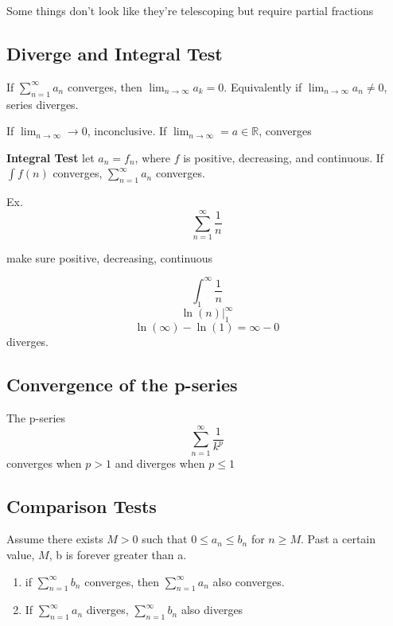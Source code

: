 Some things don't look like they're telescoping but require partial fractions

\subsection{Diverge and Integral Test}
If $\sum_{n=1}^{\infty}a_{n}$ converges, then $ \lim_{n\to\infty} a_{k}=0$. Equivalently if $ \lim_{n\to\infty} a_{n}\neq 0 $, series diverges.

If $\lim_{n\to\infty}\to0$, inconclusive. If $ \lim_{n\to\infty}=a\in\mathbb{R}$, converges



\hfill


\textbf{Integral Test} let $a_{n}=f_{n}$, where $f$ is positive, decreasing, and continuous. If $\int f(n)$ converges, $\sum_{n=1}^{\infty}a_{n}$ converges.

Ex.
\begin{equation}
	\label{}
\sum_{n=1}^{\infty}\frac{1}{n}
\end{equation}

make sure positive, decreasing, continuous 

\begin{equation}
	\label{}
	\int_{1}^{\infty} \frac{1}{n}
\end{equation}
\begin{equation}
	\label{}
	\ln(n)|^{\infty}_{1}
\end{equation}
\begin{equation}
	\label{}
	\ln(\infty) - \ln(1) = \infty - 0
\end{equation}
diverges.

\subsection{Convergence of the p-series}

The p-series
\begin{equation}
	\label{}
\sum_{n=1}^{\infty}\frac{1}{k^{p}}	
\end{equation}
converges when $p>1$ and diverges when $p\leq1$


\subsection{Comparison Tests}
Assume there exists $M>0$ such that $0\leq a_{n}\leq b_{n}$ for $n\geq M$. Past a certain value, $M$, b is forever greater than a.


\begin{enumerate}
	
	\item if $\sum_{n=1}^{\infty}b_{n}$ converges, then $\sum_{n=1}^{\infty} a_{n}$ also converges.

\item If $\sum_{n=1}^{\infty}a_{n}$ diverges, $\sum_{n=1}^{\infty}b_{n}$ also diverges
\end{enumerate}

